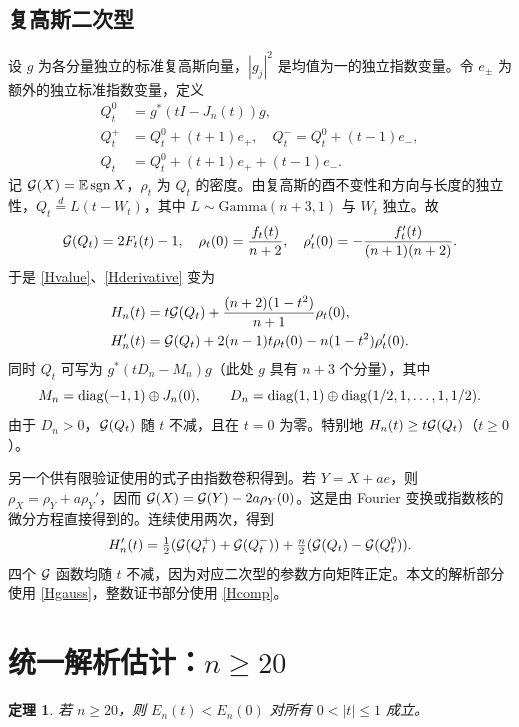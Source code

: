 \documentclass[11pt,a4paper,fontset=fandol]{ctexart}
\newtheorem{theorem}{定理}\newtheorem{lemma}{引理}\newtheorem{proposition}{命题}
\begin{document}
\subsection{复高斯二次型}
设 $g$ 为各分量独立的标准复高斯向量，$|g_j|^2$ 是均值为一的独立指数变量。令 $e_\pm$ 为额外的独立标准指数变量，定义
\begin{align*}
 Q_t^0&=g^*(tI-J_n(t))g,\\
 Q_t^+&=Q_t^0+(t+1)e_+,\quad Q_t^-=Q_t^0+(t-1)e_-,\\
 Q_t&=Q_t^0+(t+1)e_++(t-1)e_- .
\end{align*}
记 $\mathcal G(X)=\mathbb E\operatorname{sgn} X$，$\rho_t$ 为 $Q_t$ 的密度。由复高斯的酉不变性和方向与长度的独立性，$Q_t\stackrel{d}=L(t-W_t)$，其中 $L\sim\mathrm{Gamma}(n+3,1)$ 与 $W_t$ 独立。故
\[\mathcal G(Q_t)=2F_t(t)-1,\quad \rho_t(0)=\frac{f_t(t)}{n+2},\quad \rho_t'(0)=-\frac{f_t'(t)}{(n+1)(n+2)}.\]
于是 \eqref{Hvalue}、\eqref{Hderivative} 变为
\begin{align}
H_n(t)&=t\mathcal G(Q_t)+\frac{(n+2)(1-t^2)}{n+1}\rho_t(0),\label{HgaussValue}\\
H_n'(t)&=\mathcal G(Q_t)+2(n-1)t\rho_t(0)-n(1-t^2)\rho_t'(0).\label{Hgauss}
\end{align}
同时 $Q_t$ 可写为 $g^*(tD_n-M_n)g$（此处 $g$ 具有 $n+3$ 个分量），其中
\[M_n=\operatorname{diag}(-1,1)\oplus J_n(0),\qquad D_n=\operatorname{diag}(1,1)\oplus\operatorname{diag}(1/2,1,\ldots,1,1/2).\]
由于 $D_n>0$，$\mathcal G(Q_t)$ 随 $t$ 不减，且在 $t=0$ 为零。特别地 $H_n(t)\ge t\mathcal G(Q_t)$（$t\ge0$）。

另一个供有限验证使用的式子由指数卷积得到。若 $Y=X+ae$，则 $\rho_X=\rho_Y+a\rho_Y'$，因而 $\mathcal G(X)=\mathcal G(Y)-2a\rho_Y(0)$。这是由 Fourier 变换或指数核的微分方程直接得到的。连续使用两次，得到
\begin{equation}\label{Hcomp}
 H_n'(t)=\tfrac12(\mathcal G(Q_t^+)+\mathcal G(Q_t^-))+\tfrac n2(\mathcal G(Q_t)-\mathcal G(Q_t^0)).
\end{equation}
四个 $\mathcal G$ 函数均随 $t$ 不减，因为对应二次型的参数方向矩阵正定。本文的解析部分使用 \eqref{Hgauss}，整数证书部分使用 \eqref{Hcomp}。
\section{统一解析估计：$n\ge20$}\label{sec:analytic}
\begin{theorem}\label{thm:20}
若 $n\ge20$，则 $E_n(t)<E_n(0)$ 对所有 $0<|t|\le1$ 成立。
\end{theorem}
\end{document}
